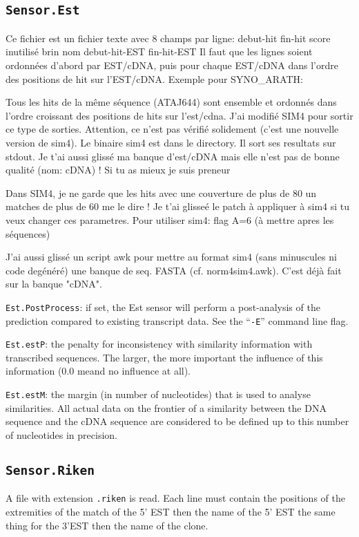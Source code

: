 \documentclass[a4paper,titlepage]{report}
\begin{document}
\subsection{\texttt{Sensor.Est}}
\label{plugest}

Ce fichier est un fichier texte avec 8 champs par ligne: debut-hit
fin-hit score inutilis\'e brin nom debut-hit-EST fin-hit-EST Il faut
que les lignes soient ordonn\'ees d'abord par EST/cDNA, puis pour
chaque EST/cDNA dans l'ordre des positions de hit sur l'EST/cDNA.
Exemple pour SYNO\_ARATH:

Tous les hits de la m\^eme s\'equence (ATAJ644) sont ensemble et ordonn\'es
dans l'ordre croissant des positions de hits sur l'est/cdna.  J'ai
modifi\'e SIM4 pour sortir ce type de sorties. Attention, ce n'est pas
v\'erifi\'e solidement (c'est une nouvelle version de sim4). Le binaire sim4
est dans le directory. Il sort ses resultats sur stdout. Je t'ai aussi
gliss\'e ma banque d'est/cDNA mais elle n'est pas de bonne qualit\'e (nom:
cDNA) ! Si tu as mieux je suis preneur

Dans SIM4, je ne garde que les hits avec une couverture de plus de 80%
un matches de plus de 60%
me le dire !  Je t'ai glisse\'e le patch \`a appliquer \`a sim4 si tu veux
changer ces parametres. Pour utiliser sim4: flag A=6 (\`a mettre apres
les s\'equences)


J'ai aussi gliss\'e un script awk pour mettre au format sim4 (sans
minuscules ni code deg\'en\'er\'e) une banque de seq. FASTA (cf.
norm4sim4.awk). C'est d\'ej\`a fait sur la banque "cDNA".


\texttt{Est.PostProcess}: if set, the Est sensor will perform a
post-analysis of the prediction compared to existing transcript data.
See the ``\texttt{-E}'' command line flag.
  
\texttt{Est.estP}: the penalty for inconsistency with similarity
information with transcribed sequences.  The larger, the more
important the influence of this information (0.0 meand no influence at
all).
  
\texttt{Est.estM}: the margin (in number of nucleotides) that is used
to analyse similarities. All actual data on the frontier of a
similarity between the DNA sequence and the cDNA sequence are
considered to be defined up to this number of nucleotides in
precision.


\subsection{\texttt{Sensor.Riken}}
A file with extension \texttt{.riken} is read.  Each line must contain
the positions of the extremities of the match of the 5' EST then the
name of the 5' EST the same thing for the 3'EST then the name of the
clone.
\end{document}
